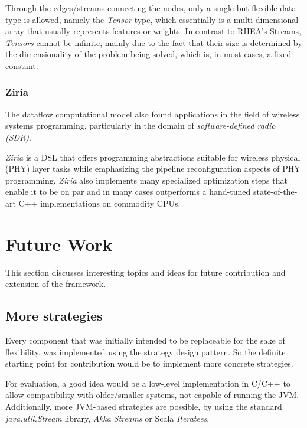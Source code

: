 \documentclass[sigplan,review,anonymous]{acmart}\settopmatter{printfolios=true,printacmref=false}
\begin{document}
Through the edges/streams connecting the nodes, only a single but flexible data type is allowed, namely the \textit{Tensor} type, which essentially is a multi-dimensional array that usually represents features or weights. In contrast to \textsc{RHEA}'s Streams, \textit{Tensors} cannot be infinite, mainly due to the fact that their size is determined by the dimensionality of the problem being solved, which is, in most cases, a fixed constant.

\subsubsection{Ziria}

The dataflow computational model also found applications in the field of wireless systems programming, particularly in the domain of \textit{software-defined radio (SDR)}.

\textit{Ziria}\cite{ziria} is a DSL that offers programming abstractions suitable for wireless physical (PHY) layer tasks while emphasizing the pipeline reconfiguration aspects of PHY programming. \textit{Ziria} also implements many specialized optimization steps that enable it to be on par and in many cases outperforms a hand-tuned state-of-the-art C++ implementations on commodity CPUs.

\section{Future Work} \label{sec:future}

This section discusses interesting topics and ideas for future contribution and extension of the framework.

\subsection{More strategies}

Every component that was initially intended to be replaceable for the sake of flexibility, was implemented using the strategy design pattern. So the definite starting point for contribution would be to implement more concrete strategies.

For evaluation, a good idea would be a low-level implementation in C/C++ to allow compatibility with older/smaller systems, not capable of running the JVM. Additionally, more JVM-based strategies are possible, by using the standard \textit{java.util.Stream} library, \textit{Akka Streams} or Scala \textit{Iteratees}\cite{iteratees}.
\end{document}
